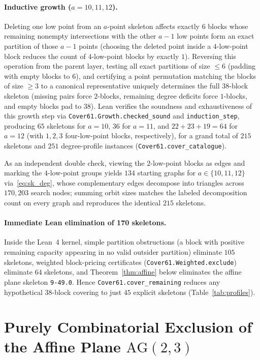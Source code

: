 \documentclass[11pt,a4paper]{article}
\theoremstyle{definition}
\theoremstyle{remark}
\newcommand{\AG}{\mathrm{AG}}
\begin{document}
\paragraph{Inductive growth ($a = 10, 11, 12$).}
Deleting one low point from an $a$-point skeleton affects exactly $6$ blocks whose remaining nonempty intersections with the other $a - 1$ low points form an exact partition of those $a - 1$ points (choosing the deleted point inside a $4$-low-point block reduces the count of $4$-low-point blocks by exactly $1$). Reversing this operation from the parent layer, testing all exact partitions of size $\le 6$ (padding with empty blocks to $6$), and certifying a point permutation matching the blocks of size $\ge 3$ to a canonical representative uniquely determines the full $38$-block skeleton (missing pairs force $2$-blocks, remaining degree deficits force $1$-blocks, and empty blocks pad to $38$). Lean verifies the soundness and exhaustiveness of this growth step via \texttt{Cover61.Growth.checked\_sound} and \texttt{induction\_step}, producing $65$ skeletons for $a=10$, $36$ for $a=11$, and $22 + 23 + 19 = 64$ for $a=12$ (with $1,2,3$ four-low-point blocks, respectively), for a grand total of $215$ skeletons and $251$ degree-profile instances (\texttt{Cover61.cover\_catalogue}).

As an independent double check, viewing the $2$-low-point blocks as edges and marking the $4$-low-point groups yields $134$ starting graphs for $a \in \{10,11,12\}$ via~\eqref{eq:sk_deg}, whose complementary edges decompose into triangles across $170{,}203$ search nodes; summing orbit sizes matches the labeled decomposition count on every graph and reproduces the identical $215$ skeletons.

\paragraph{Immediate Lean elimination of 170 skeletons.}
Inside the Lean~4 kernel, simple partition obstructions (a block with positive remaining capacity appearing in no valid outsider partition) eliminate $105$ skeletons, weighted block-pricing certificates (\texttt{Cover61.Weighted.exclude}) eliminate $64$ skeletons, and Theorem~\ref{thm:affine} below eliminates the affine plane skeleton \texttt{9-49.0}. Hence \texttt{Cover61.cover\_remaining} reduces any hypothetical $38$-block covering to just $45$ explicit skeletons (Table~\ref{tab:profiles}).

\section{Purely Combinatorial Exclusion of the Affine Plane \texorpdfstring{$\AG(2,3)$}{AG(2,3)}}\label{sec:affine}
\end{document}
